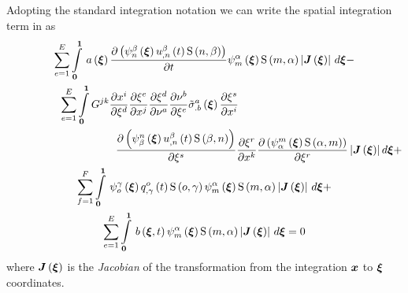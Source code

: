 Adopting the standard integration notation we can write the spatial
integration term in  as
\begin{multline}
  \dsum_{e=1}^{E}\gint{\vectr{0}}{\vectr{1}}{\fnof{a}{\vectr{\xi}}
    \delby{\pbrac{\gbfn{n}{\beta}{\vectr{\xi}}\fnof{\nodedof{u}{\beta}{n}}{t}
        \gsf{n}{\beta}}}{t}\gbfn{m}{\alpha}{\vectr{\xi}}\gsf{m}{\alpha}
    \abs{\fnof{\matr{J}}{\vectr{\xi}}}}{\vectr{\xi}} - \\
  \dsum_{e=1}^{E}\dintl{\vectr{0}}{\vectr{1}}G^{jk}\delby{x^{i}}{\xi^{d}}\delby{\xi^{e}}{x^{j}}
  \delby{\xi^{d}}{\nu^{a}}\delby{\nu^{b}}{\xi^{e}}\fnof{{\tilde{\sigma}}^{a}_{.b}}{\vectr{\xi}}
  \delby{\xi^{s}}{x^{i}}
  \quad\quad\quad\quad\quad\quad\quad\quad\quad\quad \\ \quad\quad\quad\quad\quad\quad\quad\quad\quad\quad
  \delby{\pbrac{\gbfn{\beta}{n}{\vectr{\xi}}\fnof{\nodedof{u}{\beta}{n}}{t}
      \gsf{\beta}{n}}}{\xi^{s}}\delby{\xi^{r}}{x^{k}}\delby{
    \pbrac{\gbfn{\alpha}{m}{\vectr{\xi}}\gsf{\alpha}{m}}}{\xi^{r}}
  \abs{\fnof{\matr{J}}{\vectr{\xi}}}d\vectr{\xi} + \\
  \dsum_{f=1}^{F}\gint{\vectr{0}}{\vectr{1}}{\gbfn{o}{\gamma}{\vectr{\xi}}
    \fnof{\nodedof{q}{o}{\gamma}}{t}\gsf{o}{\gamma}\gbfn{m}{\alpha}{\vectr{\xi}}
    \gsf{m}{\alpha}\abs{\fnof{\matr{J}}{\vectr{\xi}}}}{\vectr{\xi}} + \\
  \dsum_{e=1}^{E}\gint{\vectr{0}}{\vectr{1}}{\fnof{b}{\vectr{\xi},t}\gbfn{m}{\alpha}{\vectr{\xi}}
    \gsf{m}{\alpha}\abs{\fnof{\matr{J}}{\vectr{\xi}}}}{\vectr{\xi}} = 0
  \label{eqn:diffusionspatialintegration1}
\end{multline}
where $\fnof{\matr{J}}{\vectr{\xi}}$ is the \emph{Jacobian} of the
transformation from the integration $\boldsymbol{x}$ to $\boldsymbol{\xi}$ coordinates.

